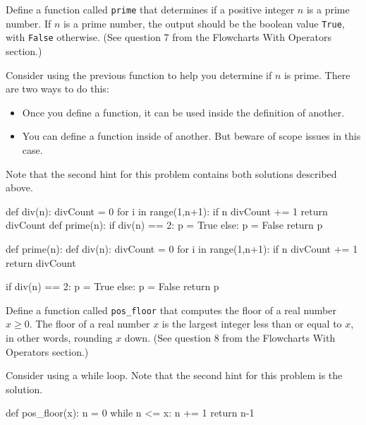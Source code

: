 \documentclass{ximera}
\begin{document}
\begin{question}
	Define a function called \verb|prime| that determines if a positive integer $n$ is a prime number. If $n$ is a prime number, the output should be the boolean value \verb|True|, with \verb|False| otherwise. (See question 7 from the Flowcharts With Operators section.)
	\begin{hint}
	Consider using the previous function to help you determine if $n$ is prime. There are two ways to do this:
	\begin{itemize}
	\item Once you define a function, it can be used inside the definition of another. 
	\item You can define a function inside of another. But beware of scope issues in this case.
	\end{itemize}
	Note that the second hint for this problem contains both solutions described above.
	\end{hint}
	\begin{hint}
\begin{sageCell}
def div(n):
        divCount = 0
        for i in range(1,n+1):
                if n%
                        divCount += 1
        return divCount
def prime(n):
        if div(n) == 2:
                p = True
        else:
                p = False
        return p
\end{sageCell}
\begin{sageCell}
def prime(n):
        def div(n):
                divCount = 0
                for i in range(1,n+1):
                        if n%
                                divCount += 1
                return divCount

        if div(n) == 2:
                p = True
        else:
                p = False
        return p
\end{sageCell}
	\end{hint}
\end{question}

\begin{question}
	Define a function called \verb|pos_floor| that computes the floor of a real number $x\geq 0$. The floor of a real number $x$ is the largest integer less than or equal to $x$, in other words, rounding $x$ down. (See question 8 from the Flowcharts With Operators section.)
	\begin{hint}
	Consider using a while loop. Note that the second hint for this problem is the solution.
	\end{hint}
	\begin{hint}
\begin{sageCell}
def pos_floor(x):
        n = 0
        while n <= x:
                n += 1
        return n-1
\end{sageCell}
	\end{hint}
\end{question}
\end{document}

